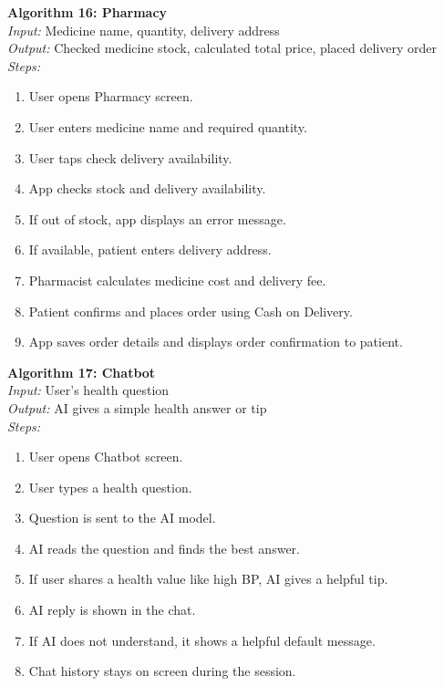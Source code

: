 \textbf{Algorithm 16: Pharmacy}\\
\textit{Input:} Medicine name, quantity, delivery address\\
\textit{Output:} Checked medicine stock, calculated total price, placed delivery order\\
\textit{Steps:}
\begin{enumerate}
    \item User opens Pharmacy screen.
    \item User enters medicine name and required quantity.
    \item User taps check delivery availability.
    \item App checks stock and delivery availability.
    \item If out of stock, app displays an error message.
    \item If available, patient enters delivery address.
    \item Pharmacist calculates medicine cost and delivery fee.
    \item Patient confirms and places order using Cash on Delivery.
    \item App saves order details and displays order confirmation to patient.
\end{enumerate}

\textbf{Algorithm 17: Chatbot}\\
\textit{Input:} User's health question\\
\textit{Output:} AI gives a simple health answer or tip\\
\textit{Steps:}
\begin{enumerate}
    \item User opens Chatbot screen.
    \item User types a health question.
    \item Question is sent to the AI model.
    \item AI reads the question and finds the best answer.
    \item If user shares a health value like high BP, AI gives a helpful tip.
    \item AI reply is shown in the chat.
    \item If AI does not understand, it shows a helpful default message.
    \item Chat history stays on screen during the session.
\end{enumerate}

